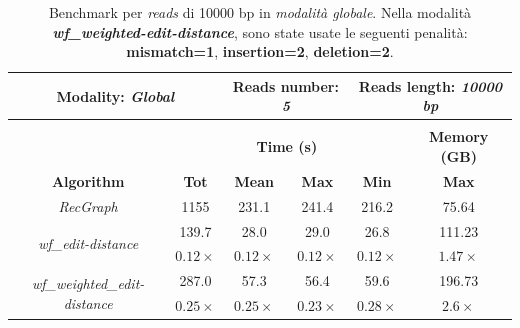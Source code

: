     \begin{table}[h]
        \centering
        \begin{tabular}{|c|c|c|c|c|c|}
            \hline
                \multicolumn{2}{|c|}{\textbf{Modality:} \emph{Global}} & \multicolumn{2}{|c|}{\textbf{Reads number: } \emph{5}} & \multicolumn{2}{|c|}{\textbf{Reads length:} \emph{10000 bp}} \\
            \hline
                \multicolumn{6}{|c|}{} \\
            \hline
                & \multicolumn{4}{|c|}{\textbf{Time (s)}} & \textbf{Memory (GB)} \\
            \hline
                \textbf{Algorithm} & \textbf{Tot} & \textbf{Mean} & \textbf{Max} & \textbf{Min} & \textbf{Max} \\
            \hline
                \emph{RecGraph} & 1155 & 231.1 & 241.4 & 216.2 & 75.64 \\
            \hline
                \multirow{2}{*}{\emph{wf\_edit-distance}} & 139.7 & 28.0 & 29.0 & 26.8 & 111.23 \\
                & $0.12 \times$ & $0.12  \times$ & $0.12 \times$ & $0.12 \times$ & $1.47 \times$ \\
            \hline
            \multirow{2}{*}{\emph{wf\_weighted\_edit-distance}} & 287.0 & 57.3 & 56.4 & 59.6 & 196.73 \\
                & $0.25 \times$ & $0.25  \times$ & $0.23 \times$ & $0.28 \times$ & $2.6 \times$ \\
            \hline
        \end{tabular}
        \caption{Benchmark per \emph{reads} di 10000 bp in \emph{modalità globale}. Nella modalità \textbf{\textit{wf\_weighted-edit-distance}}, sono state usate le seguenti penalità: \textbf{mismatch=1}, \textbf{insertion=2}, \textbf{deletion=2}.}
        \label{tab:benchmark_global_10k}
    \end{table}
    \vspace{20pt}
\clearpage
    
